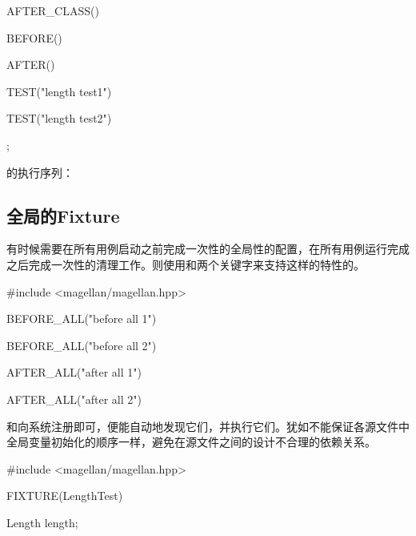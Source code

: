\begin{content}
\begin{leftbar}
\begin{c++}[caption={test/quantity/LengthTest.cpp}]
{    AFTER_CLASS()
    {}

    BEFORE()
    {}

    AFTER()
    {}

    TEST("length test1")
    {}

    TEST("length test2")
    {}
};
\end{c++}
\end{leftbar}

的执行序列：
\begin{enum}
\end{enum}

\subsection{全局的Fixture}

有时候需要在所有用例启动之前完成一次性的全局性的配置，在所有用例运行完成之后完成一次性的清理工作。则使用和两个关键字来支持这样的特性的。

\begin{leftbar}
\begin{c++}[caption={test/DatabaseTest.cpp}]
#include <magellan/magellan.hpp>

BEFORE_ALL("before all 1")
{
}

BEFORE_ALL("before all 2")
{
}

AFTER_ALL("after all 1")
{
}

AFTER_ALL("after all 2")
{
}
\end{c++}
\end{leftbar}

和向系统注册即可，便能自动地发现它们，并执行它们。犹如不能保证各源文件中全局变量初始化的顺序一样，避免在源文件之间的设计不合理的依赖关系。

\begin{leftbar}
\begin{c++}[caption={test/quantity/LengthTest.cpp}]
#include <magellan/magellan.hpp>

FIXTURE(LengthTest)
{
    Length length;

}
\end{c++}
\end{leftbar}
\end{content}
